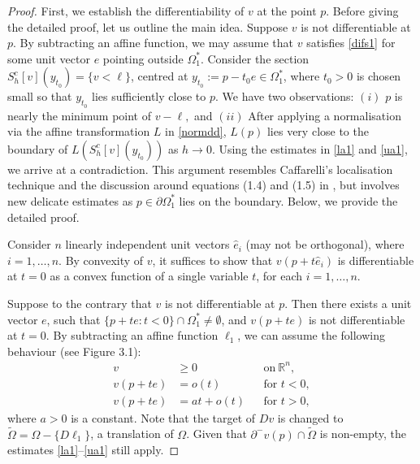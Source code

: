 \documentclass[11pt]{amsart}
\theoremstyle{plain}
\newcommand{\0}{\textbf{0}}
\numberwithin{equation}{section}
\numberwithin{equation}{section}
\numberwithin{figure}{section}
\begin{document}
\begin{proof}

First, we establish the differentiability of \( v \) at the point \( p \).
Before giving the detailed proof, let us outline the main idea. Suppose \( v \) is not differentiable at \( p \). By subtracting an affine function, we may assume that $v$ satisfies \eqref{difs1} for some unit vector $e$ pointing outside $\Omega^*_1$. Consider the section \( S^c_h[v](y_{t_0}) = \{ v < \ell \} \), centred at \( y_{t_0} := p - t_0 e \in\Omega^*_1 \), where $t_0>0$ is chosen small so that $y_{t_0}$ lies sufficiently close to $p$. We have two observations: $(i)$  $p$ is nearly the minimum point of $v-\ell,$ and $(ii)$ After applying a normalisation via the affine transformation \( L \) in \eqref{normdd}, \( L(p) \) lies very close to the boundary of \( L\left(S^c_h[v](y_{t_0})\right) \) as $h\to0$. Using the estimates in \eqref{la1} and \eqref{ua1}, we arrive at a contradiction. This argument resembles Caffarelli's localisation technique and the discussion around equations (1.4) and (1.5) in \cite{GK}, but involves new delicate estimates  as $p\in\partial\Omega^*_1$ lies on the boundary. Below, we provide the detailed proof.  


Consider \( n \) linearly independent unit vectors \( \hat{e}_i \) (may not be orthogonal), where \( i = 1, \ldots, n \). 
By convexity of $v$, it suffices to show that \( v(p + t\hat{e}_i) \) is differentiable at \( t = 0 \) as a convex function of a single variable \( t \), for each \( i = 1, \ldots, n \).

Suppose to the contrary that \( v \) is not differentiable at \( p \). Then there exists a unit vector \( e \), such that \( \{p + te : t < 0\} \cap \Omega_1^* \neq \emptyset\), and \( v(p + te) \) is not differentiable at \( t = 0 \). By subtracting an affine function \( \ell_1 \), we can assume the following behaviour (see Figure 3.1):
\begin{equation}\label{difs1}
\begin{aligned}
v &\geq 0&& \text{on}\ \mathbb{R}^n,\\
v(p + te) &= o(t) && \text{for } t < 0, \\
v(p + te) &= at + o(t) && \text{for } t > 0,
\end{aligned}
\end{equation}
where \( a>0 \) is a constant. 
Note that the target of \( Dv \) is changed to \( \tilde{\Omega} = \Omega - \{D\ell_1\} \), a translation of \( \Omega \).
Given that \( \partial^{-}v(p) \cap \tilde{\Omega} \) is non-empty, the estimates \eqref{la1}--\eqref{ua1} still apply.  


\end{proof}
\end{document}

